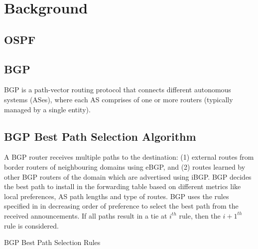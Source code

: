 \section{Background}
\subsection{OSPF}

\subsection{BGP}
BGP is a path-vector routing protocol that connects 
different autonomous systems (ASes), where each AS
comprises of one or more routers (typically managed
by a single entity). 
\\

\subsection{BGP Best Path Selection Algorithm}
A BGP router receives multiple paths to the destination: (1)
external routes from border routers of neighbouring domains using
eBGP, and (2) routes learned by other BGP routers 
of the domain which are advertised using iBGP. 
BGP decides the best path to install in the 
forwarding table based on different metrics like local preferences,
AS path lengths and type of routes. BGP uses the
rules specified in  
in decreasing order of preference to select the best path
from the received announcements. If all paths result in a tie
at $i^{th}$ rule, then the $i+1^{th}$ rule is considered.
\begin{algorithm}
	\begin{footnotesize}
		\caption{BGP Best Path Selection Rules}
		\label{alg:bgppathrules}
		\begin{algorithmic}[1]
		\end{algorithmic}
	\end{footnotesize}
\end{algorithm}


